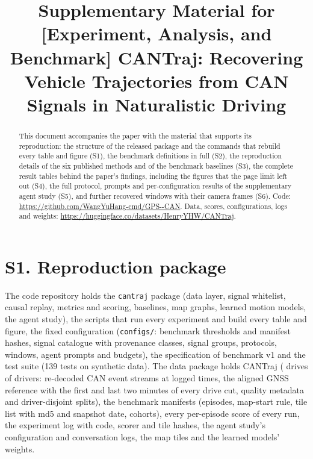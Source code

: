 \documentclass[conference]{IEEEtran}
\begin{document}
\title{Supplementary Material for\\[2pt] [Experiment, Analysis, and Benchmark] CANTraj: Recovering Vehicle Trajectories from CAN Signals in Naturalistic Driving}
\author{
}
\maketitle

\begin{abstract}
This document accompanies the paper with the material that supports its reproduction: the structure of the released
package and the commands that rebuild every table and figure (S1), the benchmark definitions in full (S2), the
reproduction details of the six published methods and of the benchmark baselines (S3), the complete result tables behind
the paper's findings, including the figures that the page limit left out (S4), the full protocol, prompts and
per-configuration results of the supplementary agent study (S5), and further recovered windows with their camera frames
(S6). Code: \url{https://github.com/WangYuHang-cmd/GPS--CAN}. Data, scores, configurations, logs and weights:
\url{https://huggingface.co/datasets/HenryYHW/CANTraj}.
\end{abstract}

\section{S1. Reproduction package}
The code repository holds the \texttt{cantraj} package (data layer, signal whitelist, causal replay, metrics and
scoring, baselines, map graphs, learned motion models, the agent study), the scripts that run every experiment and
build every table and figure, the fixed configuration (\texttt{configs/}: benchmark thresholds and manifest hashes,
signal catalogue with provenance classes, signal groups, protocols, windows, agent prompts and budgets), the
specification of benchmark v1 and the test suite (139 tests on synthetic data). The data package holds CANTraj
(\NReleaseDrives{} drives of \NReleaseDrivers{} drivers: re-decoded CAN event streams at logged times, the aligned GNSS
reference with the first and last two minutes of every drive cut, quality metadata and driver-disjoint splits), the
benchmark manifests (episodes, map-start rule, tile list with md5 and snapshot date, cohorts), every per-episode score
of every run, the experiment log with code, scorer and tile hashes, the agent study's configuration and conversation
logs, the map tiles and the learned models' weights.
\end{document}
